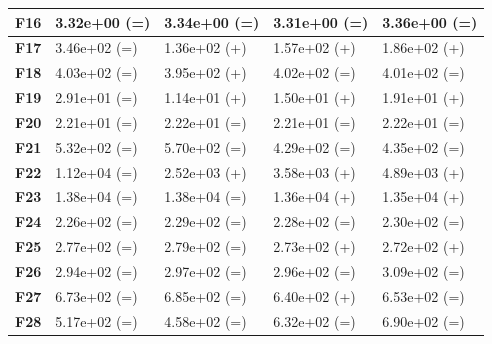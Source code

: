 \documentclass[12pt,a4paper]{report}
\begin{document}
{{{{{{{\begin{table}[h]
\begin{tabular}{|l|l|l|l|l|}
{\bf F16} & 3.32e+00 (=)        & 3.34e+00 (=)     & 3.31e+00 (=)      & 3.36e+00 (=)      \\ \hline
{\bf F17} & 3.46e+02 (=)        & 1.36e+02 (+)     & 1.57e+02 (+)      & 1.86e+02 (+)      \\ \hline
{\bf F18} & 4.03e+02 (=)        & 3.95e+02 (+)     & 4.02e+02 (=)      & 4.01e+02 (=)      \\ \hline
{\bf F19} & 2.91e+01 (=)        & 1.14e+01 (+)     & 1.50e+01 (+)      & 1.91e+01 (+)      \\ \hline
{\bf F20} & 2.21e+01 (=)        & 2.22e+01 (=)     & 2.21e+01 (=)      & 2.22e+01 (=)      \\ \hline
{\bf F21} & 5.32e+02 (=)        & 5.70e+02 (=)     & 4.29e+02 (=)      & 4.35e+02 (=)      \\ \hline
{\bf F22} & 1.12e+04 (=)        & 2.52e+03 (+)     & 3.58e+03 (+)      & 4.89e+03 (+)      \\ \hline
{\bf F23} & 1.38e+04 (=)        & 1.38e+04 (=)     & 1.36e+04 (+)      & 1.35e+04 (+)      \\ \hline
{\bf F24} & 2.26e+02 (=)        & 2.29e+02 (=)     & 2.28e+02 (=)      & 2.30e+02 (=)      \\ \hline
{\bf F25} & 2.77e+02 (=)        & 2.79e+02 (=)     & 2.73e+02 (+)      & 2.72e+02 (+)      \\ \hline
{\bf F26} & 2.94e+02 (=)        & 2.97e+02 (=)     & 2.96e+02 (=)      & 3.09e+02 (=)      \\ \hline
{\bf F27} & 6.73e+02 (=)        & 6.85e+02 (=)     & 6.40e+02 (+)      & 6.53e+02 (=)      \\ \hline
{\bf F28} & 5.17e+02 (=)        & 4.58e+02 (=)     & 6.32e+02 (=)      & 6.90e+02 (=)      \\ \hline
\end{tabular}
\end{table}


}}}}}}}
\end{document}
